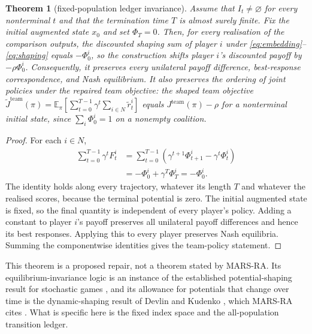 \documentclass{article}
\newtheorem{theorem}{Theorem}
\begin{document}
\begin{theorem}[fixed-population ledger invariance]
Assume that \(I_t\ne\varnothing\) for every nonterminal \(t\) and that the termination time \(T\) is almost surely finite. Fix the initial augmented state \(x_0\) and set \(\Phi_T=0\). Then, for every realisation of the comparison outputs, the discounted shaping sum of player \(i\) under \eqref{eq:embedding}--\eqref{eq:shaping} equals \(-\Phi_0^i\), so the construction shifts player \(i\)'s discounted payoff by \(-\rho\Phi_0^i\). Consequently, it preserves every unilateral payoff difference, best-response correspondence, and Nash equilibrium. It also preserves the ordering of joint policies under the repaired team objective: the shaped team objective \(\widetilde J^{\mathrm{team}}(\pi)=\mathbb E_\pi[\sum_{t=0}^{T-1}\gamma^t\sum_{i\in N}\widetilde r_t^i]\) equals \(J^{\mathrm{team}}(\pi)-\rho\) for a nonterminal initial state, since \(\sum_{i}\Phi_0^i=1\) on a nonempty coalition.
\end{theorem}

\begin{proof}
For each \(i\in N\),
\begin{align*}
 \sum_{t=0}^{T-1}\gamma^t F_t^i
 &=\sum_{t=0}^{T-1}
   \left(\gamma^{t+1}\Phi_{t+1}^i-\gamma^t\Phi_t^i\right)\\
 &=-\Phi_0^i+\gamma^T\Phi_T^i=-\Phi_0^i.
\end{align*}
The identity holds along every trajectory, whatever its length \(T\) and whatever the realised scores, because the terminal potential is zero. The initial augmented state is fixed, so the final quantity is independent of every player's policy. Adding a constant to player \(i\)'s payoff preserves all unilateral payoff differences and hence its best responses. Applying this to every player preserves Nash equilibria. Summing the componentwise identities gives the team-policy statement.
\end{proof}

This theorem is a proposed repair, not a theorem stated by MARS-RA. Its equilibrium-invariance logic is an instance of the established potential-shaping result for stochastic games \cite{lu2011policy}, and its allowance for potentials that change over time is the dynamic-shaping result of Devlin and Kudenko \cite{devlin2012dynamic}, which MARS-RA cites \cite{wang2026marsra}. What is specific here is the fixed index space and the all-population transition ledger.
\end{document}
